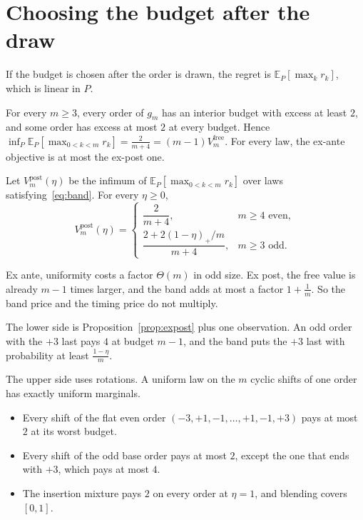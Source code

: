 \section{Choosing the budget after the draw}
\label{sec:expost}

If the budget is chosen after the order is drawn, the regret is
$\mathbb{E}_{P}[\max_{k}r_{k}]$, which is linear in $P$.

\begin{proposition}
\label{prop:expost}
For every $m\ge3$, every order of $g_{m}$ has an interior budget with excess at least $2$,
and some order has excess at most $2$ at every budget. Hence
$\inf_{P}\mathbb{E}_{P}[\max_{0<k<m}r_{k}]=\frac{2}{m+4}=(m-1)V^{\mathrm{free}}_{m}$. For
every law, the ex-ante objective is at most the ex-post one.
\end{proposition}


\begin{theorem}
\label{thm:expostband}
Let $V^{\mathrm{post}}_{m}(\eta)$ be the infimum of $\mathbb{E}_{P}[\max_{0<k<m}r_{k}]$ over laws
satisfying~\eqref{eq:band}. For every $\eta\ge0$,
\[
V^{\mathrm{post}}_{m}(\eta)=
\begin{cases}
\dfrac{2}{m+4}, & m\ge4\text{ even},\\[8pt]
\dfrac{2+2(1-\eta)_{+}/m}{m+4}, & m\ge3\text{ odd}.
\end{cases}
\]
\end{theorem}


Ex ante, uniformity costs a factor $\Theta(m)$ in odd size. Ex post, the free value is
already $m-1$ times larger, and the band adds at most a factor $1+\frac1m$. So the band price
and the timing price do not multiply.

The lower side is Proposition~\ref{prop:expost} plus one observation. An odd order with the
$+3$ last pays $4$ at budget $m-1$, and the band puts the $+3$ last with probability at least
$\frac{1-\eta}{m}$.

The upper side uses rotations. A uniform law on the $m$ cyclic shifts of one order has exactly
uniform marginals.
\begin{itemize}
\item Every shift of the flat even order $(-3,+1,-1,\dots,+1,-1,+3)$ pays at most $2$ at its
worst budget.
\item Every shift of the odd base order pays at most $2$, except the one that ends with $+3$,
which pays at most $4$.
\item The insertion mixture pays $2$ on every order at $\eta=1$, and blending covers $[0,1]$.
\end{itemize}

